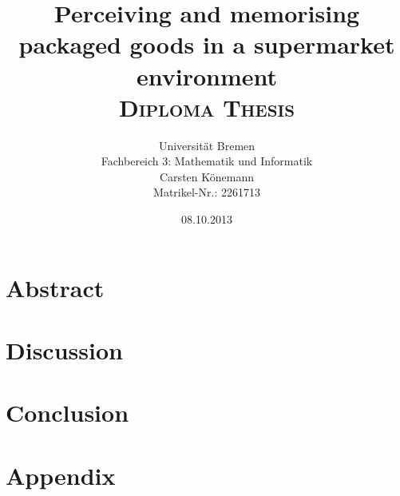 \documentclass{thesis}
\begin{document}
  \title{\textbf{Perceiving and memorising packaged goods in a supermarket environment} \vspace{7.5mm} \\ \textsc{Diploma Thesis}}
  \author{Universit\"at Bremen \\ Fachbereich 3: Mathematik und Informatik \vspace{3.5mm} \\ Carsten K\"onemann \\ Matrikel-Nr.: 2261713}
  \date{08.10.2013}

  \maketitle

  \chapter*{Abstract}

  \tableofcontents

  

  

  

  

  \chapter{Discussion}

  \chapter{Conclusion}

  
  
  \chapter{Appendix}
    \listoffigures
    \lstlistoflistings
    \listoftables

  
  
\end{document}
